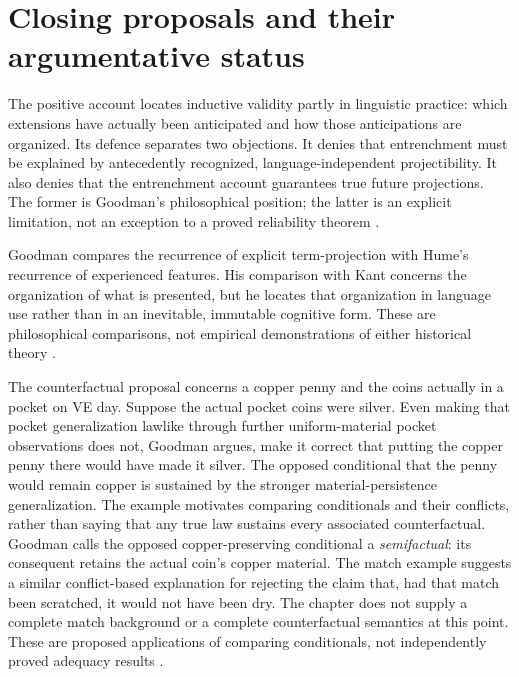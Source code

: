 \section{Closing proposals and their argumentative status}
\label{sec:p15-goodman-survey}

The positive account locates inductive validity partly in linguistic
practice: which extensions have actually been anticipated and how those
anticipations are organized. Its defence separates two objections. It
denies that entrenchment must be explained by antecedently recognized,
language-independent projectibility. It also denies that the entrenchment
account guarantees true future projections. The former is Goodman's
philosophical position; the latter is an explicit limitation, not an
exception to a proved reliability theorem
\parencite[pp.~96--99, 120--121]{Goodman1983FourthProjection}.

Goodman compares the recurrence of explicit term-projection with Hume's
recurrence of experienced features. His comparison with Kant concerns
the organization of what is presented, but he locates that organization
in language use rather than in an inevitable, immutable cognitive form.
These are philosophical comparisons, not empirical demonstrations of
either historical theory \parencite[pp.~96--97]{Goodman1983FourthProjection}.

The counterfactual proposal concerns a copper penny and the coins actually
in a pocket on VE day. Suppose the actual pocket coins were silver. Even
making that pocket generalization lawlike through further uniform-material
pocket observations does not, Goodman argues, make it correct that putting
the copper penny there would have made it silver. The opposed conditional
that the penny would remain copper is sustained by the stronger
material-persistence generalization. The example motivates comparing
conditionals and their conflicts, rather than saying that any true law
sustains every associated counterfactual. Goodman calls the opposed
copper-preserving conditional a \emph{semifactual}: its consequent retains
the actual coin's copper material. The match example suggests a similar
conflict-based explanation for rejecting the claim that, had that match
been scratched, it would not have been dry. The chapter does not supply
a complete match background or a complete counterfactual semantics at
this point. These are proposed applications of comparing conditionals,
not independently proved adequacy results
\parencite[pp.~121--122 and n.~23]{Goodman1983FourthProjection}.

